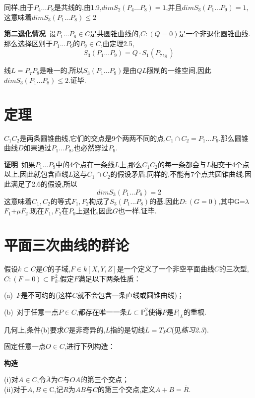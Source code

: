 \documentclass[UTF8]{book}
\begin{document}
		
		同样,由于$P_{4}...P_{8}$是共线的,由1.9,$dim S_{2}(P_{4} ... P_{8} )=1$,并且$dim S_{3}(P_{1} ... P_{9} )=1$,这意味着$dim S_{3}(P_{1} ... P_{8})\le 2$
		
		
		\textbf{第二退化情况}\ 设$P_{1} ... P_{6} \in C$是共圆锥曲线的,$ C:(Q=0) $是一个非退化圆锥曲线.那么选择区别于$P_{1} ... P_{6}$的$P_{9} \in C$,由定理2.5,
		\begin{equation*}
		S_{3}(P_{1} ... P_{9} )=Q· S_{1} (P_{7},_{8} )
		\end{equation*}
	
	
		线$L= P_{7} P_{8}$是唯一的,所以$S_{3}(P_{1}...P_{9})$是由$ QL $限制的一维空间,因此$dim S_{3}(P_{1} ... P_{8})\le 2$.证毕.
	\section{定理}
		$C_{1} C_{2}$是两条圆锥曲线,它们的交点是9个两两不同的点,$C_{1} \cap C_{2} ={ P_{1} ... P_{9} }$.那么圆锥曲线$ D $如果通过$P_{1} ... P_{8}$,也必然穿过$P_{9}$.
		
		
		\textbf{证明}\ 如果$P_{1} ... P_{9}$中的4个点在一条线$ L $上,那么$C_{1} C_{2}$的每一条都会与$ L $相交于4个点以上,因此就包含直线$ L $这与$C_{1}\cap C_{2}$的假设矛盾.同样的,不能有7个点共圆锥曲线.因此满足了2.6的假设,所以
		\begin{equation*}
		dim S_{3}\left(P_{1} \ldots P_{8}\right)=2
		\end{equation*}
		这意味着$C_{1},C_{2}$的等式$F_{1},F_{2}$构成了$S_{3}(P_{1} ... P_{8} )$的基.因此$ D:(G=0) $,其中G=$\lambda$$F_{1}$+$\mu$$F_{2}$.现在$F_{1},F_{2}$在$P_{9}$上退化,因此$ G $也一样.证毕.
	\section{平面三次曲线的群论}
		假设$ k \subset C $是$ C $的子域,$ F \in k[X,Y,Z] $是一个定义了一个非空平面曲线$ C $的三次型,$C:(F=0) \subset \mathbb{P}^{2}_{k}$.假定$ F $满足以下两条性质：
		
		
		(a)\ $ F $是不可约的(这样$ C $就不会包含一条直线或圆锥曲线)；
		
		
		(b)\ 对于任意一点$ P \in C $,都存在唯一一条$L \subset \mathbb{P}^{2}_{k}$使得$ P $是$F|_{L}$的重根.
		
		
		几何上,条件(b)要求$ C $是非奇异的,$ L $指的是切线$L=T_{P} C$(见\textit{练习2.3}).
		
		
		固定任意一点$ O \in C $,进行下列构造：
		
		
		\textbf{构造}\ 
		\begin{minipage}[t]{0.9\linewidth}
			(i)对$ A \in C $,令$\overline{A}$为$ C $与$ OA $的第三个交点；\\
			(ii)对于$A,B\in$C,记$ R $为$ AB $与$ C $的第三个交点,定义$A+B=\overline{R}$.
		\end{minipage}
		
\end{document}
